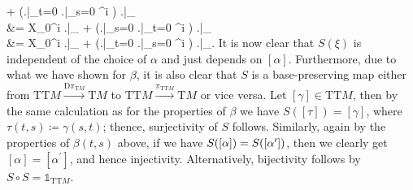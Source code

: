 \documentclass[a4paper,oneside,11pt,bibliography=totoc]{scrartcl}
\theoremstyle{plain}
\theoremstyle{remark}
\theoremstyle{definition}
\begin{document}
	+ \mleft(\mleft.\mright|_{t=0} \mleft.\mright|_{s=0} \beta^i \mright) \mleft.\mright|_{\omega}
\nonumber
\\
&=
X_0^i \mleft.\mright|_{\omega}
	+ \mleft(\mleft.\mright|_{s=0} \mleft.\mright|_{t=0} \alpha^i \mright) \mleft.\mright|_{\omega}
\nonumber
\\
&=
X_0^i \mleft.\mright|_{\omega}
	+ \mleft(\mleft.\mright|_{t=0} \mleft.\mright|_{s=0} \alpha^i \mright) \mleft.\mright|_{\omega}.
\ea
It is now clear that $S(\xi)$ is independent of the choice of $\alpha$ and just depends on $[\alpha]$. Furthermore, due to what we have shown for $\beta$, it is also clear that $S$ is a base-preserving map either from $\mathrm{TT}M \stackrel{\mathrm{D}\pi_{\mathrm{T}M}}{\to} \mathrm{T}M$ to $\mathrm{TT}M \stackrel{\pi_{\mathrm{TT}M}}{\to} \mathrm{T}M$ or vice versa. Let $[\gamma] \in \mathrm{TT}M$, then by the same calculation as for the properties of $\beta$ we have $S([\tau]) = [\gamma]$, where $\tau(t, s) \coloneqq \gamma(s, t)$; thence, surjectivity of $S$ follows. Similarly, again by the properties of $\beta(t, s)$ above, if we have $S([\alpha]) = S\mleft( \mleft[ \alpha^\prime \mright] \mright)$, then we clearly get $[\alpha] = [\alpha^\prime]$, and hence injectivity. Alternatively, bijectivity follows by $S\circ S = \mathds{1}_{\mathrm{TT}M}$.
\end{document}
